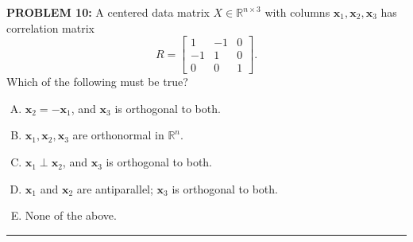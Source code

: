 \documentclass[12pt]{amsart}
\newcommand{\divider}{
  \vspace{-1em} %
  \noindent
  \raisebox{-0.15ex}{\textbullet}%
  \hspace{0.5em}%
  \rule[0.5ex]{0.95\textwidth}{1.0pt}%
  \hspace{0.5em}%
  \raisebox{-0.15ex}{\textbullet}%
  \vspace{0em} %
}
\begin{document}
{\bf PROBLEM 10:}
A centered data matrix $X \in \mathbb{R}^{n \times 3}$ with columns
$\mathbf{x}_1, \mathbf{x}_2, \mathbf{x}_3$ has correlation matrix
$$R = \begin{bmatrix} 1 & -1 & 0 \\ -1 & 1 & 0 \\ 0 & 0 & 1 \end{bmatrix}.$$
Which of the following must be true?
\begin{enumerate}[(A)]
\item $\mathbf{x}_2 = -\mathbf{x}_1$, and $\mathbf{x}_3$ is orthogonal to both.
\item $\mathbf{x}_1, \mathbf{x}_2, \mathbf{x}_3$ are orthonormal in $\mathbb{R}^n$.
\item $\mathbf{x}_1 \perp \mathbf{x}_2$, and $\mathbf{x}_3$ is orthogonal to both.
\item $\mathbf{x}_1$ and $\mathbf{x}_2$ are antiparallel; $\mathbf{x}_3$ is orthogonal to both.
\item None of the above.
\end{enumerate}
%
\divider
\end{document}
